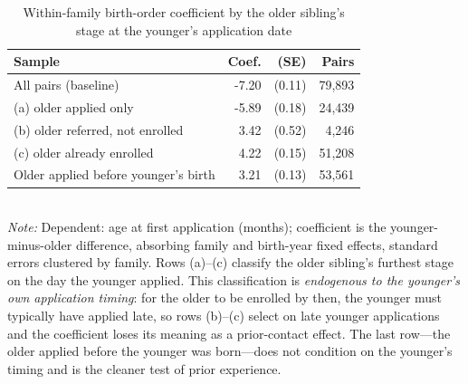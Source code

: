 \begin{table}[htbp]\centering
\caption{Within-family birth-order coefficient by the older sibling's stage at the younger's application date}
\label{tab:P4stage}
\footnotesize
\setlength{\tabcolsep}{4pt}
\begin{tabular}{lrrr}
\toprule
Sample & Coef. & (SE) & Pairs \\
\midrule
All pairs (baseline) & -7.20 & (0.11) & 79,893 \\
(a) older applied only & -5.89 & (0.18) & 24,439 \\
(b) older referred, not enrolled & 3.42 & (0.52) & 4,246 \\
(c) older already enrolled & 4.22 & (0.15) & 51,208 \\
Older applied before younger's birth & 3.21 & (0.13) & 53,561 \\
\bottomrule
\end{tabular}
\\[3pt]{\footnotesize \textit{Note:} Dependent: age at first application (months); coefficient is the younger-minus-older difference, absorbing family and birth-year fixed effects, standard errors clustered by family. Rows (a)--(c) classify the older sibling's furthest stage on the day the younger applied. This classification is \emph{endogenous to the younger's own application timing}: for the older to be enrolled by then, the younger must typically have applied late, so rows (b)--(c) select on late younger applications and the coefficient loses its meaning as a prior-contact effect. The last row---the older applied before the younger was born---does not condition on the younger's timing and is the cleaner test of prior experience.}
\end{table}
